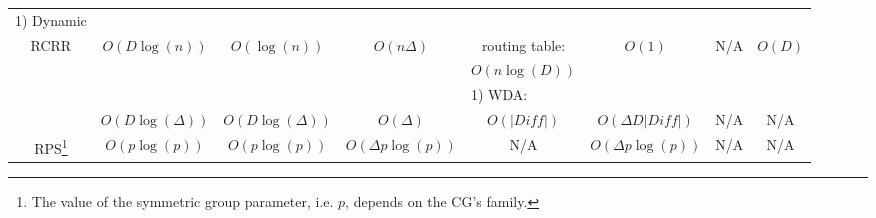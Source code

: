 \begin{table*}[!t]
\begin{minipage}{\textwidth}
\begin{tabular}{|c|c|c|c|l|l|l|c|}
\multirow{1}{*}{1) Dynamic}&&&\\
\multirow{1}{*}{RCRR}&\multirow{1}{*}{$O(D\log{(n)})$}&\multirow{1}{*}{$O(\log{(n)})$}&\multirow{1}{*}{$O(n\Delta )$}& 
\multicolumn{1}{c|}{\multirow{1}{*}{routing table:}}&\multicolumn{1}{c|}{\multirow{1}{*}{$O(1)$}}&\multicolumn{1}{c|}{\multirow{1}{*}{N/A}}&\multicolumn{1}{c|}{\multirow{1}{*}{$O(D)$}}\\
\multirow{1}{*}{}&\multirow{-2}{*}{}&\multirow{-2}{*}{}&\multirow{-2}{*}{}& 
\multicolumn{1}{c|}{\multirow{1}{*}{$O(n\log{(D)})$}}&\multicolumn{1}{c|}{\multirow{-2}{*}{}}&\multicolumn{1}{c|}{\multirow{-2}{*}{}}&\\
\rowcolor{gray!10}&&&& 
\multirow{1}{*}{1) WDA:}&&&\\
\rowcolor{gray!10}\multirow{-2}{*}{GRWMS$^\textit{a}$}&\multirow{-2}{*}{$O(D\log{(\Delta)})$}&\multirow{-2}{*}{$O(D\log{(\Delta)})$}&\multirow{-2}{*}{$O(\Delta)$}&\multicolumn{1}{c|}{ $O(|Diff|)$}&\multicolumn{1}{c|}{\multirow{-2}{*}{$O(\Delta D|Diff|)$}}&\multicolumn{1}{c|}{\multirow{-2}{*}{N/A}}&\multirow{-2}{*}{N/A}\\
\multirow{1}{*}{RPS\footnote{The value of the symmetric group parameter, i.e. $p$, depends on the CG's family.}}&
\multicolumn{1}{c|}{$O(p\log{(p)})$}&\multicolumn{1}{c|}{$O(p\log{(p)})$}&\multicolumn{1}{c|}{$O(\Delta p\log{(p)})$}&
\multicolumn{1}{c|}{N/A}&\multicolumn{1}{c|}{\multirow{1}{*}{$O(\Delta p\log{(p)})$}}&\multicolumn{1}{c|}{\multirow{1}{*}{N/A}}&
\multicolumn{1}{c|}{N/A}\\
\hline
\end{tabular}
\end{minipage}
\end{table*}